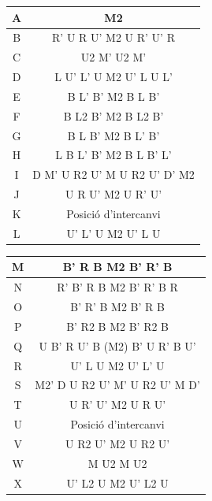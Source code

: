 \begin{table}[h]
    \begin{minipage}{.5\linewidth}
        \centering
        \begin{tabular}{|c|c|}
            \hline
            A & M2 \\
            \hline
            B & R' U R U' M2 U R' U' R \\
            \hline
            C & U2 M' U2 M' \\
            \hline
            D & L U' L' U M2 U' L U L'  \\
            \hline
            E & B L' B' M2 B L B'  \\
            \hline
            F & B L2 B' M2 B L2 B' \\
            \hline
            G & B L B' M2 B L' B' \\
            \hline
            H & L B L' B' M2 B L B' L' \\
            \hline
            I & D M' U R2 U' M U R2 U' D' M2 \\
            \hline
            J & U R U' M2 U R' U' \\
            \hline
            K & Posició d'intercanvi \\
            \hline
            L & U' L' U M2 U' L U \\
            \hline 
        \end{tabular}
    \end{minipage}
    \begin{minipage}{.5\linewidth}
        \centering
        \begin{tabular}{|c|c|}
            \hline
             M & B' R B M2 B' R' B \\
             \hline
             N & R' B' R B M2 B' R' B R  \\
             \hline
             O & B' R' B M2 B' R B \\
             \hline
             P & B' R2 B M2 B' R2 B \\
             \hline
             Q & U B' R U' B (M2) B' U R' B U' \\
             \hline
             R & U' L U M2 U' L' U \\
             \hline
             S & M2' D U R2 U' M' U R2 U' M D' \\
             \hline
             T & U R' U' M2 U R U'  \\
             \hline
             U & Posició d'intercanvi \\
             \hline
             V & U R2 U' M2 U R2 U' \\
             \hline
             W & M U2 M U2  \\
             \hline
             X & U' L2 U M2 U' L2 U \\
             \hline 
        \end{tabular}
    \end{minipage} 
\end{table}

